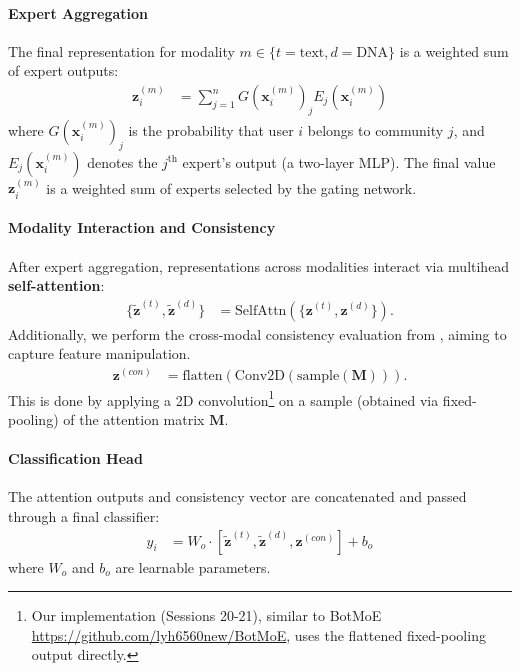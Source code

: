 \documentclass[conference]{IEEEtran}
\begin{document}
\paragraph{Expert Aggregation}
The final representation for modality \( m \in \{t=\text{text}, d=\text{DNA}\} \) is a weighted sum of expert outputs:
\begin{align}
\mathbf{z}_i^{(m)} &= \sum_{j=1}^{n} G(\mathbf{x}_i^{(m)})_j E_j(\mathbf{x}_i^{(m)})
\end{align}
where \( G(\mathbf{x}_i^{(m)})_j \) is the probability that user $i$ belongs to community $j$,
and \( E_j(\mathbf{x}_i^{(m)}) \) denotes the \( j^\text{th} \) expert's output (a two-layer MLP).
The final value \(\mathbf{z}_i^{(m)} \) is a weighted sum of experts selected by the gating network.

\paragraph{Modality Interaction and Consistency}
After expert aggregation, representations across modalities interact via multihead \textbf{self-attention}:
\begin{align}
\{\tilde{\mathbf{z}}^{(t)}, \tilde{\mathbf{z}}^{(d)}\} &= \text{SelfAttn}(\{\mathbf{z}^{(t)}, \mathbf{z}^{(d)}\}).
\end{align}
Additionally, we perform the cross-modal consistency evaluation 
from \citet{liu2023botmoe}, aiming to capture feature manipulation.
\begin{align} \label{eq:moe-conv}
\mathbf{z}^{(con)} &= \text{flatten}(\text{Conv2D}(\text{sample}(\mathbf{M}))).
\end{align}
This is done by applying a 2D convolution\footnote{
    Our implementation (Sessions 20-21), similar
    to BotMoE \url{https://github.com/lyh6560new/BotMoE},
    uses the flattened fixed-pooling output directly. 
     }
on a sample (obtained via fixed-pooling) of the attention matrix \( \mathbf{M} \).

\paragraph{Classification Head}
The attention outputs and consistency vector are concatenated and passed through a final classifier:
\begin{align} \label{eq:moe-final-concat}
y_i &= W_o \cdot [\tilde{\mathbf{z}}^{(t)}, \tilde{\mathbf{z}}^{(d)}, \mathbf{z}^{(con)}] + b_o
\end{align}
where \( W_o \) and \( b_o \) are learnable parameters.
\end{document}
